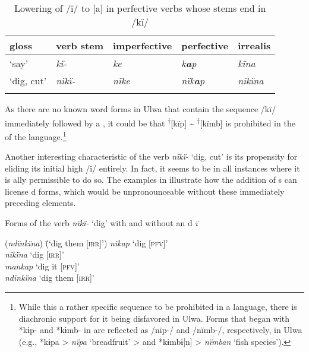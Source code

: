 \begin{table}
\caption{Lowering of /ï/ to [a] in perfective verbs whose stems end in /kï/}
\label{tab:4.1}
\begin{tabularx}{\textwidth}{QQQQQ}
\lsptoprule
gloss & verb stem & imperfective & perfective & irrealis\\
\midrule
‘say’ & {\itshape kï-} & {\itshape ke} & {\itshape k\textbf{a}p} & {\itshape kïna}\\
‘dig, cut’ & {\itshape nïkï-} & {\itshape nïke} & {\itshape nïk\textbf{a}p} & {\itshape nïkïna}\\
\lspbottomrule
\end{tabularx}
\end{table}
As there are no known word forms in Ulwa that contain the sequence /kï/ immediately followed by a , it could be that \textsuperscript{†}[kïp] {\textasciitilde} \textsuperscript{†}[kïmb] is prohibited in the  of the language.\footnote{While this a rather specific sequence to be prohibited in a language, there is diachronic support for it being disfavored in Ulwa. Forms that began with *kɨp- and *kɨmb- in  are reflected as /nïp-/ and /nïmb-/, respectively, in Ulwa (e.g., *kɨpa > \textit{nïpa} ‘breadfruit’ > and *kɨmbɨ[n] > \textit{nïmban} ‘fish species’).}



  Another interesting characteristic of the verb \textit{nïkï-} ‘dig, cut’ is its propensity for eliding its initial  high  /ï/ entirely. In fact, it seems to be  in all instances where it is ally permissible to do so. The examples in  illustrate how the addition of s can license d forms, which would be unpronounceable without these immediately preceding elements.

\ea%
    \label{ex:verbs:2a}
            Forms of the verb \textit{nïkï-} ‘dig’ with and without an d \textit{ï}\\
\begin{tabbing}
{(\textit{ndïnkïna})} \= {(‘dig them [\textsc{irr}]’)}\kill
\textit{nïkap} \> {‘dig [\textsc{pfv}]’}\\
\textit{nïkïna} \> {‘dig [\textsc{irr}]’}\\
\textit{mankap} \> {‘dig it [\textsc{pfv}]’}\\
\textit{ndïnkïna}\> {‘dig them [\textsc{irr}]’}
\end{tabbing}
 \z

